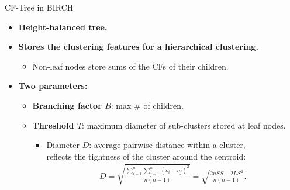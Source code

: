 \begin{frame}{CF-Tree in BIRCH}
	\begin{itemize}
		\item \textbf{Height-balanced tree.}
		\item \textbf{Stores the clustering features for a hierarchical
			      clustering.}
		      \begin{itemize}
			      \item Non-leaf nodes store sums of the CFs of their children.
		      \end{itemize}
		\item \textbf{Two parameters:}
		      \begin{itemize}
			      \item \textbf{\color{airforceblue}Branching factor $B$}: max \# of
			            children.
			      \item \textbf{\color{airforceblue}Threshold $T$}: maximum diameter
			            of sub-clusters stored at leaf nodes.
			            \begin{itemize}
				            \item Diameter $D$: average pairwise distance within a cluster,
				                  \\
				                  reflects the tightness of the cluster around the centroid:
				                  \begin{align}
					                  D = \sqrt{\frac{\sum_{i=1}^{n} \sum_{j=1}^{n}
							                  (o_i-o_j)^2}{n(n-1)}} = \sqrt{\frac{2nSS - 2LS^2}{n(n-1)}}.
				                  \end{align}
			            \end{itemize}
		      \end{itemize}
	\end{itemize}
\end{frame}

